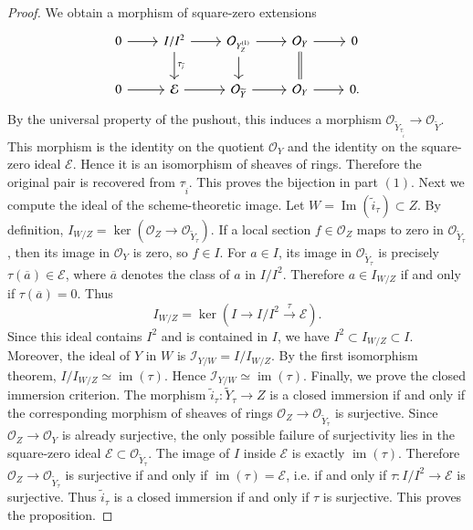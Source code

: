 \documentclass[11pt,twoside]{amsart}
\theoremstyle{plain}
\numberwithin{equation}{section}
\theoremstyle{definition}
\begin{document}
\begin{proof}
We obtain a morphism of square-zero extensions
\[
\begin{tikzcd}
    0 \arrow[r] &
    I/I^2 \arrow[r] \arrow[d,"\tau_{\widetilde i}"] &
    \mathcal O_{Y^{(1)}_Z} \arrow[r] \arrow[d] &
    \mathcal O_Y \arrow[r] \arrow[d,equal] &
    0
    \\
    0 \arrow[r] &
    \mathcal E \arrow[r] &
    \mathcal O_{\widetilde Y} \arrow[r] &
    \mathcal O_Y \arrow[r] &
    0 .
\end{tikzcd}
\]
By the universal property of the pushout, this induces a morphism
\(\mathcal O_{\widetilde Y_{\tau_{\widetilde i}}}\to\mathcal O_{\widetilde Y}\).
This morphism is the identity on the quotient \(\mathcal O_Y\) and the identity on the square-zero ideal \(\mathcal E\). Hence it is an isomorphism of sheaves of rings. Therefore the original pair is recovered from \(\tau_{\widetilde i}\). This proves the bijection in
part \((1)\). Next we compute the ideal of the scheme-theoretic image. Let
\(W=\operatorname{Im}(\widetilde i_\tau)\subset Z\). By definition,
\(I_{W/Z}=\ker\left(\mathcal O_Z\to \mathcal O_{\widetilde Y_\tau}\right)\).
If a local section \(f\in\mathcal O_Z\) maps to zero in \(\mathcal O_{\widetilde Y_\tau}\), then its image in \(\mathcal O_Y\) is zero, so \(f\in I\). For \(a\in I\), its image in \(\mathcal O_{\widetilde Y_\tau}\) is precisely \(\tau(\overline a)\in\mathcal E\), where \(\overline a\) denotes the class of \(a\) in \(I/I^2\). Therefore \(a\in I_{W/Z}\) if and only if \(\tau(\overline a)=0\). Thus
\[
    I_{W/Z}
    =
    \ker\left(
        I
        \longrightarrow
        I/I^2
        \xrightarrow{\tau}
        \mathcal E
    \right).
\]
Since this ideal contains \(I^2\) and is contained in \(I\), we have
\(I^2\subset I_{W/Z}\subset I\). Moreover, the ideal of \(Y\) in \(W\) is
\(\mathcal I_{Y/W}=I/I_{W/Z}\). By the first isomorphism theorem,
\(I/I_{W/Z}\simeq\operatorname{im}(\tau)\). Hence
\(\mathcal I_{Y/W}\simeq \operatorname{im}(\tau)\). Finally, we prove the closed immersion criterion. The morphism \(\widetilde i_\tau:\widetilde Y_\tau\to Z\) is a closed immersion if and only if the corresponding morphism of sheaves of rings
\(\mathcal O_Z\to \mathcal O_{\widetilde Y_\tau}\) is surjective. Since
\(\mathcal O_Z\to\mathcal O_Y\) is already surjective, the only possible failure of
surjectivity lies in the square-zero ideal \(\mathcal E\subset\mathcal O_{\widetilde Y_\tau}\). The image of \(I\) inside \(\mathcal E\) is exactly \(\operatorname{im}(\tau)\). Therefore \(\mathcal O_Z\to \mathcal O_{\widetilde Y_\tau}\) is surjective if and only if \(\operatorname{im}(\tau)=\mathcal E\), i.e. if and only if \(\tau:I/I^2\to\mathcal E\) is surjective. Thus \(\widetilde i_\tau\) is a closed immersion if and only if \(\tau\) is surjective. This proves the proposition.
\end{proof}
\end{document}
